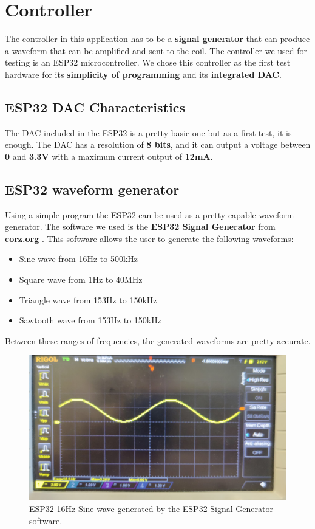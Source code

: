 \section{Controller}
The controller in this application has to be a \textbf{signal generator} that can produce a waveform that can be amplified and sent to the coil.
The controller we used for testing is an ESP32 microcontroller.
We chose this controller as the first test hardware for its \textbf{simplicity of programming} and its \textbf{integrated DAC}.

\subsection{ESP32 DAC Characteristics}
The DAC included in the ESP32 is a pretty basic one but as a first test, it is enough.
The DAC has a resolution of \textbf{8 bits}, and it can output a voltage between \textbf{0} and \textbf{3.3V} with a maximum current output of \textbf{12mA}.

\subsection{ESP32 waveform generator}
Using a simple program the ESP32 can be used as a pretty capable waveform generator.
The software we used is the \textbf{ESP32 Signal Generator} from \textbf{\href{https://corz.org}{corz.org}} \cite{corz_signal_gen}.
This software allows the user to generate the following waveforms:
\begin{itemize}
    \item Sine wave from 16Hz to 500kHz
    \item Square wave from 1Hz to 40MHz
    \item Triangle wave from 153Hz to 150kHz 
    \item Sawtooth wave from 153Hz to 150kHz
\end{itemize}

\begin{samepage}
    Between these ranges of frequencies, the generated waveforms are pretty accurate.
    \nopagebreak

    \begin{figure}[H]
        \centering
        \includegraphics[width=0.8\linewidth]{Chapters/Chapter4/Figures/16Hz_signal_gen.jpg}
        \caption{ESP32 16Hz Sine wave generated by the ESP32 Signal Generator software.}
        \label{fig:16Hz_signal_gen}
    \end{figure}
\end{samepage}


